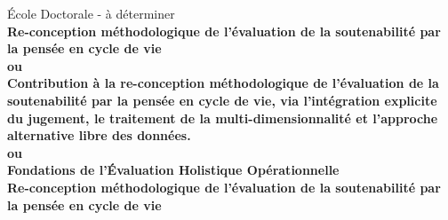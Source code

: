 \begin{titlepage}
  École Doctorale - à déterminer\\%
  { \large \bfseries
Re-conception méthodologique de l'évaluation de la soutenabilité par la pensée en cycle de vie\\
ou\\
Contribution à la re-conception méthodologique de l'évaluation de la soutenabilité par la pensée en cycle de vie, via l'intégration explicite du jugement, le traitement de la multi-dimensionnalité et l'approche alternative libre des données.\\
ou\\
Fondations de l'Évaluation Holistique Opérationnelle\\Re-conception méthodologique de l'évaluation de la soutenabilité par la pensée en cycle de vie
}
\end{titlepage}
